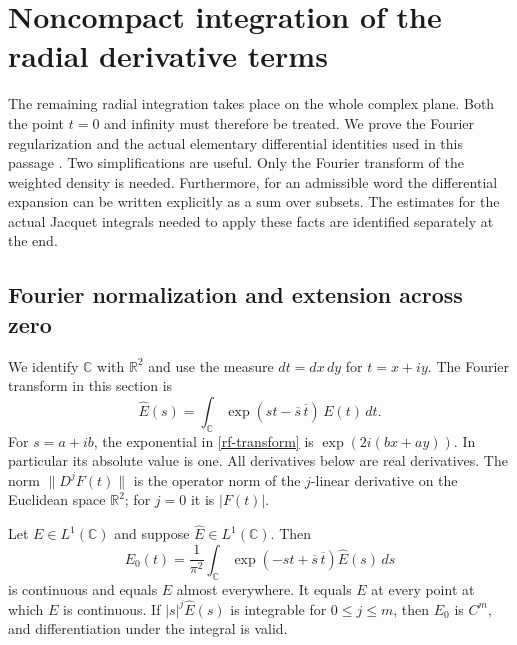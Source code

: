 \section{Noncompact integration of the radial derivative terms}
\label{rf-section}

The remaining radial integration takes place on the whole complex
plane.  Both the point $t=0$ and infinity must therefore be treated.
We prove the Fourier regularization and the actual elementary
differential identities used in this passage
\cite{alpo-uniform-source}.  Two simplifications are useful.
Only the Fourier transform of the weighted density is needed.
Furthermore, for an admissible word the differential expansion
can be written explicitly as a sum over subsets.
The estimates for the actual Jacquet integrals needed to apply
these facts are identified separately at the end.

\subsection{Fourier normalization and extension across zero}

We identify $\mathbb C$ with $\mathbb R^2$ and use the measure
$dt=dx\,dy$ for $t=x+iy$.  The Fourier transform in this section is
\begin{equation}\label{rf-transform}
 \widehat E(s)=\int_{\mathbb C}
        \exp(st-\overline s\,\overline t)\,E(t)\,dt.
\end{equation}
For $s=a+ib$, the exponential in \eqref{rf-transform} is
$\exp(2i(bx+ay))$.  In particular its absolute value is one.
All derivatives below are real derivatives.  The norm
$\|D^jF(t)\|$ is the operator norm of the $j$-linear derivative
on the Euclidean space $\mathbb R^2$; for $j=0$ it is $|F(t)|$.

\begin{lemma}\label{rf-inversion}
Let $E\in L^1(\mathbb C)$ and suppose
$\widehat E\in L^1(\mathbb C)$.  Then
\begin{equation}\label{rf-inverse}
 E_0(t)=\frac1{\pi^2}\int_{\mathbb C}
       \exp(-st+\overline s\,\overline t)\widehat E(s)\,ds
\end{equation}
is continuous and equals $E$ almost everywhere.
It equals $E$ at every point at which $E$ is continuous.
If $|s|^j\widehat E(s)$ is integrable for $0\leq j\leq m$,
then $E_0$ is $C^m$, and differentiation under the integral is valid.
\end{lemma}

